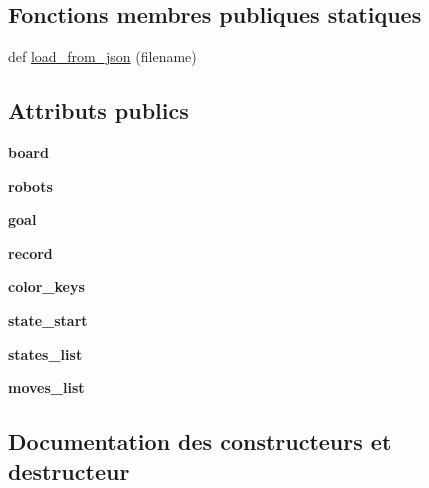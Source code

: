 \subsection*{Fonctions membres publiques statiques}
\begin{DoxyCompactItemize}
\item 
def \hyperlink{classgame_1_1Game_a60b7efdaf394c7f10a249eb7c539afe3}{load\+\_\+from\+\_\+json} (filename)
\end{DoxyCompactItemize}
\subsection*{Attributs publics}
\begin{DoxyCompactItemize}
\item 
\mbox{\label{classgame_1_1Game_aebe3d53b7d67e752a35a26d18536c4fa}} 
{\bfseries board}
\item 
\mbox{\label{classgame_1_1Game_a11e55b885ece3eb5e7dfe7772086d55d}} 
{\bfseries robots}
\item 
\mbox{\label{classgame_1_1Game_a74e55df5bbb57b5e22a8b66d6e0d0191}} 
{\bfseries goal}
\item 
\mbox{\label{classgame_1_1Game_a5b06cf5a463d3474722aba40c5bb7919}} 
{\bfseries record}
\item 
\mbox{\label{classgame_1_1Game_a411615e1fe1f2a51290fa21bd4b8a06a}} 
{\bfseries color\+\_\+keys}
\item 
\mbox{\label{classgame_1_1Game_a1e1066716b28377232eb2876dfa03dac}} 
{\bfseries state\+\_\+start}
\item 
\mbox{\label{classgame_1_1Game_a48ea4c1038f95e7bedab8cd62e79e76b}} 
{\bfseries states\+\_\+list}
\item 
\mbox{\label{classgame_1_1Game_a28d186db1f6e43f22a67a9bdd0ae5a0c}} 
{\bfseries moves\+\_\+list}
\end{DoxyCompactItemize}


\subsection{Documentation des constructeurs et destructeur}
\mbox{\label{classgame_1_1Game_af5743a4c7beabed4dd5dea74a39bbb99}} 
